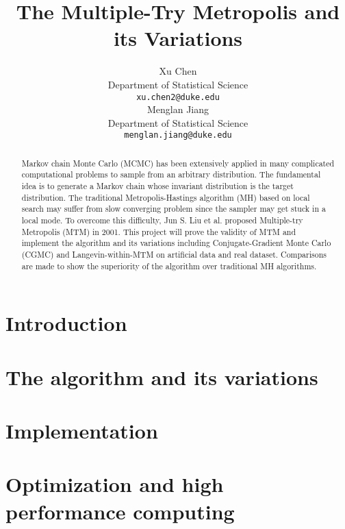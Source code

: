 \documentclass{article} %
\title{The Multiple-Try Metropolis and its Variations}
\author{
Xu Chen\\
Department of Statistical Science\\
\texttt{xu.chen2@duke.edu} \\
\And
Menglan Jiang\\
Department of Statistical Science\\
\texttt{menglan.jiang@duke.edu}
}
\begin{document}
\maketitle

\begin{abstract}
Markov chain Monte Carlo (MCMC) has been extensively applied in many complicated computational problems to sample from an arbitrary distribution. The fundamental idea is to generate a Markov chain whose invariant distribution is the target distribution. The traditional Metropolis-Hastings algorithm (MH) based on local search may suffer from slow converging problem since the sampler may get stuck in a local mode. To overcome this difficulty, Jun S. Liu et al. proposed Multiple-try Metropolis (MTM) in 2001. This project will prove the validity of MTM and implement the algorithm and its variations including Conjugate-Gradient Monte Carlo (CGMC) and Langevin-within-MTM on artificial data and real dataset. Comparisons are made to show the superiority of the algorithm over traditional MH algorithms.
\end{abstract}

\section{Introduction}

\subsection{}

\subsection{}

\section{The algorithm and its variations}


\section{Implementation}



\section{Optimization and high performance computing}
\end{document}
